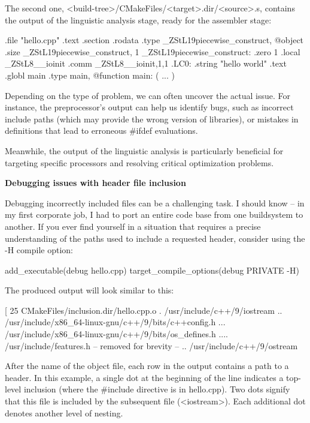 The second one, <build-tree>/CMakeFiles/<target>.dir/<source>.s, contains the output of the linguistic analysis stage, ready for the assembler stage:

\begin{shell}
        .file "hello.cpp"
        .text
        .section .rodata
        .type _ZStL19piecewise_construct, @object
        .size _ZStL19piecewise_construct, 1
_ZStL19piecewise_construct:
        .zero 1
        .local _ZStL8__ioinit
        .comm _ZStL8__ioinit,1,1
.LC0:
        .string "hello world"
        .text
        .globl main
        .type main, @function
main:
( ... )
\end{shell}

Depending on the type of problem, we can often uncover the actual issue. For instance, the preprocessor’s output can help us identify bugs, such as incorrect include paths (which may provide the wrong version of libraries), or mistakes in definitions that lead to erroneous \#ifdef evaluations.

Meanwhile, the output of the linguistic analysis is particularly beneficial for targeting specific processors and resolving critical optimization problems.

\noindent
\textbf{Debugging issues with header file inclusion}

Debugging incorrectly included files can be a challenging task. I should know – in my first corporate job, I had to port an entire code base from one buildsystem to another. If you ever find yourself in a situation that requires a precise understanding of the paths used to include a requested header, consider using the -H compile option:


\begin{cmake}
add_executable(debug hello.cpp)
target_compile_options(debug PRIVATE -H)
\end{cmake}

The produced output will look similar to this:

\begin{shell}
[ 25%
  CMakeFiles/inclusion.dir/hello.cpp.o
. /usr/include/c++/9/iostream
.. /usr/include/x86_64-linux-gnu/c++/9/bits/c++config.h
... /usr/include/x86_64-linux-gnu/c++/9/bits/os_defines.h
.... /usr/include/features.h
-- removed for brevity --
.. /usr/include/c++/9/ostream
\end{shell}

After the name of the object file, each row in the output contains a path to a header. In this example, a single dot at the beginning of the line indicates a top-level inclusion (where the \#include directive is in hello.cpp). Two dots signify that this file is included by the subsequent file (<iostream>).
Each additional dot denotes another level of nesting.

